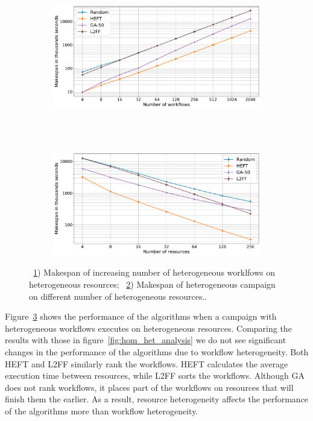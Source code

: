 \begin{figure}[ht!]
    \centering
    \begin{subfigure}[b]{0.75\textwidth}
        \includegraphics[width=.95\textwidth]{figures/campaign/StHeteroCampaigns_4StHeteroResources.pdf}
        \caption{}
        \label{fig:StHeteroCampaigns_4StHeteroResources}
    \end{subfigure}\\
    ~ 
    \begin{subfigure}[b]{0.75\textwidth}
        \includegraphics[width=.95\textwidth]{figures/campaign/StHeteroResources_StHeteroCampaigns.pdf}
        \caption{}
        \label{fig:StHeteroResources_StHeteroCampaigns}
    \end{subfigure}
    \caption{~\ref{fig:StHeteroCampaigns_4StHeteroResources}) Makespan of increasing number of heterogeneous worklfows on heterogeneous resources;
        ~\ref{fig:StHeteroResources_StHeteroCampaigns}) Makespan of heterogeneous campaign on different number of heterogeneous resources..}
    \label{fig:heter_analysis}
\end{figure}

Figure~\ref{fig:heter_analysis} shows the performance of the algorithms when a campaign with heterogeneous workflows executes on heterogeneous resources.
Comparing the results with those in figure~\ref{fig:hom_het_analysis} we do not see significant changes in the performance of the algorithms due to workflow heterogeneity.
Both HEFT and L2FF similarly rank the workflows.
HEFT calculates the average execution time between resources, while L2FF sorts the workflows.
Although GA does not rank workflows, it places part of the workflows on resources that will finish them the earlier.
As a result, resource heterogeneity affects the performance of the algorithms more than workflow heterogeneity.

